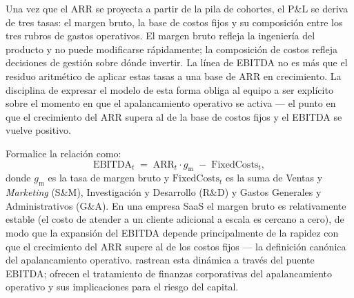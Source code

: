 Una vez que el ARR se proyecta a partir de la pila de cohortes, el P\&L se deriva de tres
tasas: el margen bruto, la base de costos fijos y su composición entre los tres rubros de gastos
operativos. El margen bruto refleja la ingeniería del producto y no puede modificarse
rápidamente; la composición de costos refleja decisiones de gestión sobre dónde invertir. La
línea de EBITDA no es más que el residuo aritmético de aplicar estas tasas a una base de ARR en
crecimiento. La disciplina de expresar el modelo de esta forma obliga al equipo a ser explícito
sobre el momento en que el apalancamiento operativo se activa --- el punto en que el crecimiento
del ARR supera al de la base de costos fijos y el EBITDA se vuelve positivo.

Formalice la relación como:
\begin{equation}\label{eq:op-model}
  \mathrm{EBITDA}_{t}
  \;=\;
  \mathrm{ARR}_{t}\cdot g_{\mathrm{m}}
  \;-\;
  \mathrm{FixedCosts}_{t},
\end{equation}
donde $g_{\mathrm{m}}$ es la tasa de margen bruto y $\mathrm{FixedCosts}_{t}$ es la suma de
Ventas y \emph{Marketing} (S\&M), Investigación y Desarrollo (R\&D) y Gastos Generales y
Administrativos (G\&A). En una empresa SaaS el margen bruto es relativamente estable (el costo
de atender a un cliente adicional a escala es cercano a cero), de modo que la expansión del
EBITDA depende principalmente de la rapidez con que el crecimiento del ARR supere al de los
costos fijos --- la definición canónica del apalancamiento operativo.
\textcite{koller2025valuation} rastrean esta dinámica a través del puente EBITDA; \textcite{ross2022}
ofrecen el tratamiento de finanzas corporativas del apalancamiento operativo y sus implicaciones
para el riesgo del capital.

